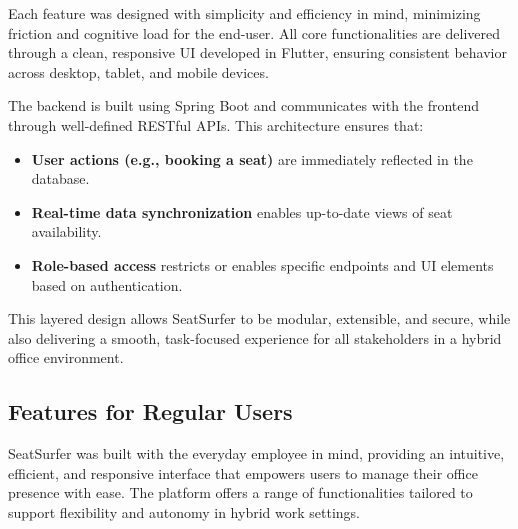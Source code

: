 \documentclass[12pt,a4paper]{report} %
\begin{document}
Each feature was designed with simplicity and efficiency in mind, minimizing friction and cognitive load for the end-user. All core functionalities are delivered through a clean, responsive UI developed in Flutter, ensuring consistent behavior across desktop, tablet, and mobile devices.

The backend is built using Spring Boot and communicates with the frontend through well-defined RESTful APIs. This architecture ensures that:

\begin{itemize}
    \item \textbf{User actions (e.g., booking a seat)} are immediately reflected in the database.
    \item \textbf{Real-time data synchronization} enables up-to-date views of seat availability.
    \item \textbf{Role-based access} restricts or enables specific endpoints and UI elements based on authentication.
\end{itemize}

This layered design allows SeatSurfer to be modular, extensible, and secure, while also delivering a smooth, task-focused experience for all stakeholders in a hybrid office environment.

\subsection{Features for Regular Users}

SeatSurfer was built with the everyday employee in mind, providing an intuitive, efficient, and responsive interface that empowers users to manage their office presence with ease. The platform offers a range of functionalities tailored to support flexibility and autonomy in hybrid work settings.
\end{document}
